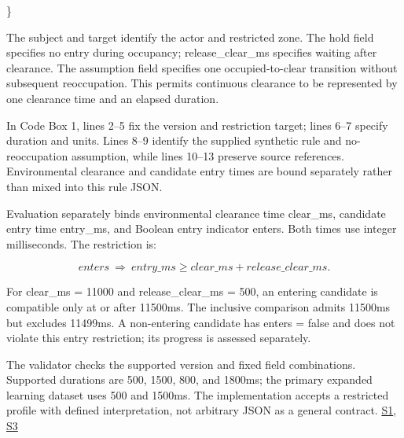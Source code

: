 \documentclass[11pt,a4paper]{article}
\begin{document}
\begin{minipage}{\linewidth}
{\begin{minipage}{\dimexpr\linewidth-2\fboxsep-2\fboxrule\relax}
\noindent{}\hspace{.8em}\parbox[t]{\dimexpr\linewidth-2.8em\relax}{\raggedright\ttfamily\fontsize{8.2}{10.5}\selectfont \hspace*{0.0em}\}\strut}\par\vspace{1pt}
\end{minipage}}\par\medskip
\end{minipage}\par\medskip

The {\ttfamily\small subject} and {\ttfamily\small target} identify the actor and restricted zone. The {\ttfamily\small hold} field specifies no entry during occupancy; {\ttfamily\small release\_clear\_ms} specifies waiting after clearance. The {\ttfamily\small assumption} field specifies one occupied-to-clear transition without subsequent reoccupation. This permits continuous clearance to be represented by one clearance time and an elapsed duration.\par

In Code Box 1, lines 2–5 fix the version and restriction target; lines 6–7 specify duration and units. Lines 8–9 identify the supplied synthetic rule and no-reoccupation assumption, while lines 10–13 preserve source references. Environmental clearance and candidate entry times are bound separately rather than mixed into this rule JSON.\par

Evaluation separately binds environmental clearance time {\ttfamily\small clear\_ms}, candidate entry time {\ttfamily\small entry\_ms}, and Boolean entry indicator {\ttfamily\small enters}. Both times use integer milliseconds. The restriction is:\par

\[\mathit{enters}\ \Longrightarrow\ \mathit{entry\_ms}\geq\mathit{clear\_ms}+\mathit{release\_clear\_ms}.\]

For {\ttfamily\small clear\_ms = 11000} and {\ttfamily\small release\_clear\_ms = 500}, an entering candidate is compatible only at or after 11500ms. The inclusive comparison admits 11500ms but excludes 11499ms. A non-entering candidate has {\ttfamily\small enters = false} and does not violate this entry restriction; its progress is assessed separately.\par

The validator checks the supported version and fixed field combinations. Supported durations are 500, 1500, 800, and 1800ms; the primary expanded learning dataset uses 500 and 1500ms. The implementation accepts a restricted profile with defined interpretation, not arbitrary JSON as a general contract. \href{\detokenize{../../../../../../projects/04-guardsynth-coc/experiments/paper1_cnl_learning/temporal_preservation.py}}{S1}, \href{\detokenize{../../../../../../projects/04-guardsynth-coc/experiments/paper1_cnl_learning/temporal_training_data.py}}{S3}\par
\end{document}
